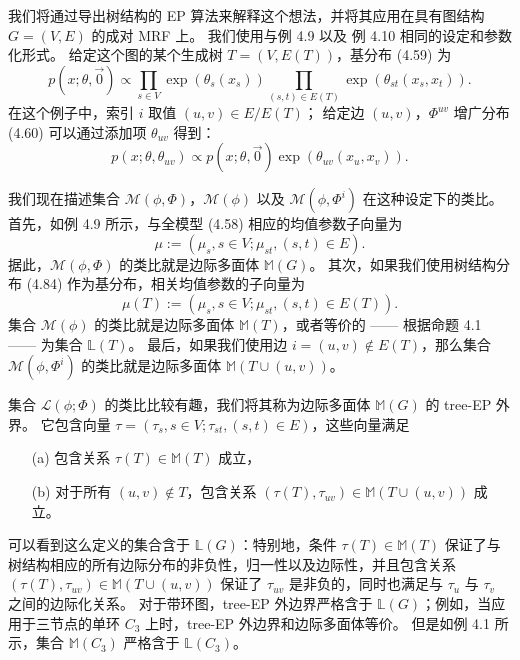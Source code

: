 \begin{tcolorbox}
\begin{exam}[树结构的 EP]
    我们将通过导出树结构的 EP 算法来解释这个想法，并将其应用在具有图结构 $G = (V, E)$ 的成对 MRF 上。
    我们使用与例 4.9 以及 例 4.10 相同的设定和参数化形式。
    给定这个图的某个生成树 $T = (V, E(T))$，基分布 (4.59) 为
    \begin{equation}
        p(x; \theta, \vec{0}) \propto \prod_{s \in V}\exp(\theta_s(x_s))\prod_{(s, t) \in E(T)}\exp(\theta_{st}(x_s, x_t)).
    \end{equation}
    在这个例子中，索引 $i$ 取值 $(u, v) \in E/E(T)$；
    给定边 $(u, v)$，$\Phi^{uv}$ 增广分布 (4.60) 可以通过添加项 $\theta_{uv}$ 得到：
    \begin{equation}
        p(x; \theta, \theta_{uv}) \propto p(x; \theta, \vec{0})\exp(\theta_{uv}(x_u, x_v)).
    \end{equation}

    我们现在描述集合 $\mathcal{M}(\phi, \Phi)$，$\mathcal{M}(\phi)$ 以及 $\mathcal{M}(\phi, \Phi^i)$ 在这种设定下的类比。
    首先，如例 4.9 所示，与全模型 (4.58) 相应的均值参数子向量为
    \begin{equation*}
        \mu := (\mu_s, s \in V; \mu_{st}, (s, t) \in E).
    \end{equation*}
    据此，$\mathcal{M}(\phi, \Phi)$ 的类比就是边际多面体 $\mathbb{M}(G)$。
    其次，如果我们使用树结构分布 (4.84) 作为基分布，相关均值参数的子向量为
    \begin{equation*}
        \mu(T) := (\mu_s, s \in V; \mu_{st}, (s, t) \in E(T)).
    \end{equation*}
    集合 $\mathcal{M}(\phi)$ 的类比就是边际多面体 $\mathbb{M}(T)$，或者等价的 —— 根据命题 4.1 —— 为集合 $\mathbb{L}(T)$。
    最后，如果我们使用边 $i = (u, v) \notin E(T)$，那么集合 $\mathcal{M}(\phi, \Phi^i)$ 的类比就是边际多面体 $\mathbb{M}(T \cup (u, v))$。

    集合 $\mathcal{L}(\phi; \Phi)$ 的类比比较有趣，我们将其称为边际多面体 $\mathbb{M}(G)$ 的 tree-EP 外界。
    它包含向量 $\tau = (\tau_s, s \in V; \tau_{st}, (s, t) \in E)$，这些向量满足
    \begin{itemize}
        \item[(a)] 包含关系 $\tau(T) \in \mathbb{M}(T)$ 成立，
        \item[(b)] 对于所有 $(u, v) \notin T$，包含关系 $(\tau(T), \tau_{uv}) \in \mathbb{M}(T \cup (u, v))$ 成立。
    \end{itemize}
    可以看到这么定义的集合含于 $\mathbb{L}(G)$：特别地，条件 $\tau(T) \in \mathbb{M}(T)$ 保证了与树结构相应的所有边际分布的非负性，归一性以及边际性，并且包含关系 $(\tau(T), \tau_{uv}) \in \mathbb{M}(T \cup (u, v))$ 保证了 $\tau_{uv}$ 是非负的，同时也满足与 $\tau_u$ 与 $\tau_v$ 之间的边际化关系。
    对于带环图，tree-EP 外边界严格含于 $\mathbb{L}(G)$；例如，当应用于三节点的单环 $C_3$ 上时，tree-EP 外边界和边际多面体等价。
    但是如例 4.1 所示，集合 $\mathbb{M}(C_3)$ 严格含于 $\mathbb{L}(C_3)$。
    

\end{exam}
\end{tcolorbox}
